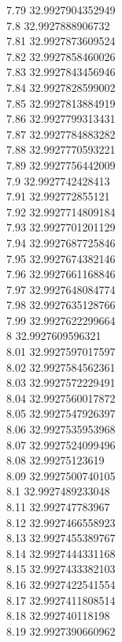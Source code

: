 {7.79	32.9927904352949\\
7.8	32.9927888906732\\
7.81	32.9927873609524\\
7.82	32.9927858460026\\
7.83	32.9927843456946\\
7.84	32.9927828599002\\
7.85	32.9927813884919\\
7.86	32.9927799313431\\
7.87	32.9927784883282\\
7.88	32.9927770593221\\
7.89	32.9927756442009\\
7.9	32.9927742428413\\
7.91	32.992772855121\\
7.92	32.9927714809184\\
7.93	32.9927701201129\\
7.94	32.9927687725846\\
7.95	32.9927674382146\\
7.96	32.9927661168846\\
7.97	32.9927648084774\\
7.98	32.9927635128766\\
7.99	32.9927622299664\\
8	32.9927609596321\\
8.01	32.9927597017597\\
8.02	32.9927584562361\\
8.03	32.9927572229491\\
8.04	32.9927560017872\\
8.05	32.9927547926397\\
8.06	32.9927535953968\\
8.07	32.9927524099496\\
8.08	32.99275123619\\
8.09	32.9927500740105\\
8.1	32.9927489233048\\
8.11	32.992747783967\\
8.12	32.9927466558923\\
8.13	32.9927455389767\\
8.14	32.9927444331168\\
8.15	32.9927433382103\\
8.16	32.9927422541554\\
8.17	32.9927411808514\\
8.18	32.992740118198\\
8.19	32.9927390660962\\
}
